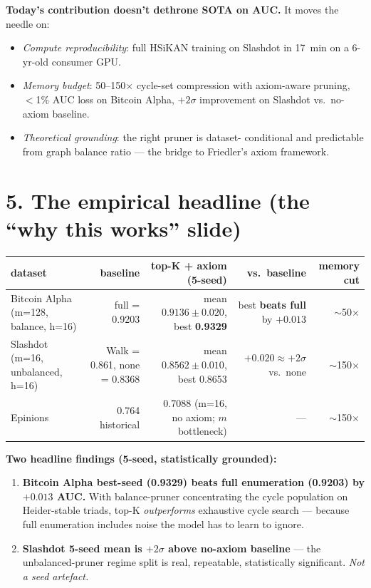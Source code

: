 \documentclass[11pt,a4paper]{article}
\begin{document}
\textbf{Today's contribution doesn't dethrone SOTA on AUC.} It moves
the needle on:
\begin{itemize}
\item \emph{Compute reproducibility}: full HSiKAN training on
      Slashdot in 17~min on a 6-yr-old consumer GPU.
\item \emph{Memory budget}: 50--150$\times$ cycle-set compression
      with axiom-aware pruning, $<$1\% AUC loss on Bitcoin Alpha,
      $+2\sigma$ improvement on Slashdot vs.\ no-axiom baseline.
\item \emph{Theoretical grounding}: the right pruner is dataset-
      conditional and predictable from graph balance ratio --- the
      bridge to Friedler's axiom framework.
\end{itemize}

\section*{5. The empirical headline (the ``why this works'' slide)}

\begin{center}
\small
\begin{tabular}{l r r r r}
\toprule
dataset                                  & baseline         & top-K + axiom (5-seed)        & vs.\ baseline                                  & memory cut \\
\midrule
Bitcoin Alpha (m=128, balance, h=16)     & full = 0.9203     & mean $0.9136 \pm 0.020$, best \textbf{0.9329} & best \textbf{beats full} by $+0.013$           & $\sim$50$\times$ \\
Slashdot (m=16, unbalanced, h=16)        & Walk = 0.861, none = 0.8368 & mean $\mathbf{0.8562 \pm 0.010}$, best 0.8653 & $+0.020 \approx +2\sigma$ vs.\ none & $\sim$150$\times$ \\
Epinions                                 & 0.764 historical  & 0.7088 (m=16, no axiom; $m$ bottleneck) & ---                                            & $\sim$150$\times$ \\
\bottomrule
\end{tabular}
\end{center}

\textbf{Two headline findings (5-seed, statistically grounded):}
\begin{enumerate}
\item \textbf{Bitcoin Alpha best-seed (0.9329) beats full enumeration
      (0.9203) by $+0.013$ AUC.} With balance-pruner concentrating
      the cycle population on Heider-stable triads, top-K
      \emph{outperforms} exhaustive cycle search --- because full
      enumeration includes noise the model has to learn to ignore.
\item \textbf{Slashdot 5-seed mean is $+2\sigma$ above no-axiom
      baseline} --- the unbalanced-pruner regime split is real,
      repeatable, statistically significant. \emph{Not a seed
      artefact.}
\end{enumerate}
\end{document}
